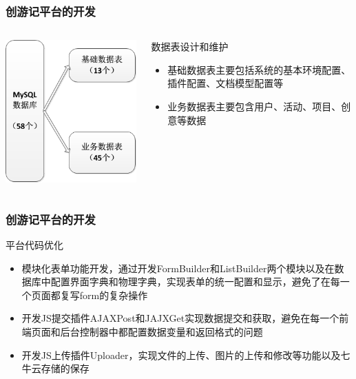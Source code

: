 \documentclass{beamer}
\begin{document}
\begin{frame}
  \frametitle{创游记平台的开发}
  \begin{columns}
    \begin{column}{0.40\textwidth}
      \includegraphics[width=\textwidth]{./img/mysql.png}
    \end{column}
    \begin{column}{0.60\textwidth}
      \begin{block}{数据表设计和维护}
        \begin{itemize}
          \item 基础数据表主要包括系统的基本环境配置、插件配置、文档模型配置等
          \item 业务数据表主要包含用户、活动、项目、创意等数据
        \end{itemize}
      \end{block}
    \end{column}
  \end{columns}
\end{frame}

\begin{frame}
  \frametitle{创游记平台的开发}
  \begin{block}{平台代码优化}
    \begin{itemize}
      \item 模块化表单功能开发，通过开发FormBuilder和ListBuilder两个模块以及在数据库中配置界面字典和物理字典，实现表单的统一配置和显示，避免了在每一个页面都复写form的复杂操作
      \item 开发JS提交插件AJAXPost和JAJXGet实现数据提交和获取，避免在每一个前端页面和后台控制器中都配置数据变量和返回格式的问题
      \item 开发JS上传插件Uploader，实现文件的上传、图片的上传和修改等功能以及七牛云存储的保存
    \end{itemize}
  \end{block}
\end{frame}
\end{document}
